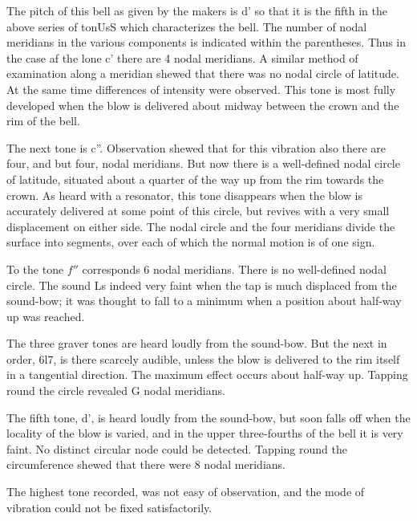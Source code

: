 The pitch of this bell as given by the makers is d' so that it is the fifth in
the above series of tonUsS which characterizes the bell. The number of nodal
meridians in the various components is indicated within the parentheses. Thus
in the case af the lone c' there are 4 nodal meridians. A similar method of
examination along a meridian shewed that there was no nodal circle of latitude.
At the same time differences of intensity were observed. This tone is most
fully developed when the blow is delivered about midway between the crown and
the rim of the bell.

The next tone is c”. Observation shewed that for this vibration also there are
four, and but four, nodal meridians. But now there is a well-defined nodal
circle of latitude, situated about a quarter of the way up from the rim towards
the crown. As heard with a resonator, this tone disappears when the blow is
accurately delivered at some point of this circle, but revives with a very
small displacement on either side. The nodal circle and the four meridians
divide the surface into segments, over each of which the normal motion is of
one sign.

To the tone \(f''\) corresponds 6 nodal meridians. There is no well-defined nodal
circle. The sound Ls indeed very faint when the tap is much displaced from the
sound-bow; it was thought to fall to a minimum when a position about half-way
up was reached.

The three graver tones are heard loudly from the sound-bow.  But the next in
order, 6l7, is there scarcely audible, unless the blow is delivered to the rim
itself in a tangential direction. The maximum effect occurs about half-way up.
Tapping round the circle revealed G nodal meridians.

The fifth tone, d', is heard loudly from the sound-bow, but soon falls off when
the locality of the blow is varied, and in the upper three-fourths of the bell
it is very faint. No distinct circular node could be detected. Tapping round
the circumference shewed that there were 8 nodal meridians.

The highest tone recorded, was not easy of observation, and the mode of
vibration could not be fixed satisfactorily.

